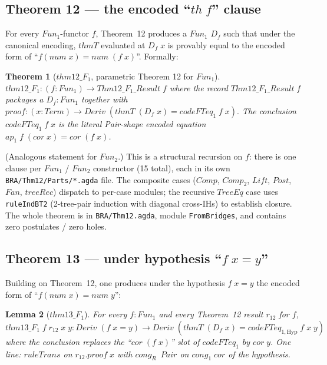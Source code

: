 \documentclass[11pt]{article}
\newtheorem{theorem}{Theorem}
\newtheorem{lemma}[theorem]{Lemma}
\begin{document}
\subsection{Theorem 12 --- the encoded ``$\mathit{th}\;f$'' clause}

For every $\mathit{Fun}_1$-functor $f$, Theorem~12 produces a $\mathit{Fun}_1$
$D_f$ such that under the canonical encoding,
$\mathit{thmT}$ evaluated at $D_f\;x$ is provably equal to the encoded form of
``$f(\mathit{num}\;x) = \mathit{num}\;(f\;x)$''.  Formally:

\begin{theorem}[$\mathit{thm12}\_F_1$, parametric Theorem 12 for $\mathit{Fun}_1$]
\(
  \mathit{thm12}\_F_1 : (f : \mathit{Fun}_1) \to \mathit{Thm12\_F_1\_Result}\;f
\)
where the record $\mathit{Thm12\_F_1\_Result}\;f$ packages a $D_f : \mathit{Fun}_1$ together with
\(
  \mathit{proof} : (x : \mathit{Term}) \to \mathit{Deriv}\;(\mathit{thmT}\;(D_f\;x) = \mathit{codeFTeq}_1\;f\;x).
\)
The conclusion $\mathit{codeFTeq}_1\;f\;x$ is the literal Pair-shape encoded equation
$\mathit{ap}_1\;f\;(\mathit{cor}\;x) = \mathit{cor}\;(f\;x)$.
\end{theorem}

(Analogous statement for $\mathit{Fun}_2$.)
This is a structural recursion on $f$: there is one clause per
$\mathit{Fun}_1$ / $\mathit{Fun}_2$ constructor (15 total), each in its own
\verb|BRA/Thm12/Parts/*.agda| file.  The composite cases ($\mathit{Comp}$,
$\mathit{Comp}_2$, $\mathit{Lift}$, $\mathit{Post}$, $\mathit{Fan}$, $\mathit{treeRec}$)
dispatch to per-case modules; the recursive $\mathit{TreeEq}$ case uses
\verb|ruleIndBT2| (2-tree-pair induction with diagonal cross-IHs) to
establish closure.  The whole theorem is in
\verb|BRA/Thm12.agda|, module \verb|FromBridges|, and contains zero
postulates / zero holes.

\subsection{Theorem 13 --- under hypothesis ``$f\;x = y$''}

Building on Theorem~12, one produces under the hypothesis $f\;x = y$
the encoded form of ``$f(\mathit{num}\;x) = \mathit{num}\;y$'':

\begin{lemma}[$\mathit{thm13}\_F_1$]
For every $f : \mathit{Fun}_1$ and every Theorem~12 result $r_{12}$ for $f$,
\(
  \mathit{thm13}\_F_1\;f\;r_{12}\;x\;y : \mathit{Deriv}\;(f\;x = y) \to
    \mathit{Deriv}\;(\mathit{thmT}\;(D_f\;x) = \mathit{codeFTeq}_{1,\mathrm{Hyp}}\;f\;x\;y)
\)
where the conclusion replaces the ``$\mathit{cor}\;(f\;x)$'' slot of
$\mathit{codeFTeq}_1$ by $\mathit{cor}\;y$.  One line: $\mathit{ruleTrans}$ on
$r_{12}.\mathit{proof}\;x$ with $\mathit{cong}_R$~$\mathit{Pair}$ on $\mathit{cong}_1\;\mathit{cor}$ of the hypothesis.
\end{lemma}
\end{document}
